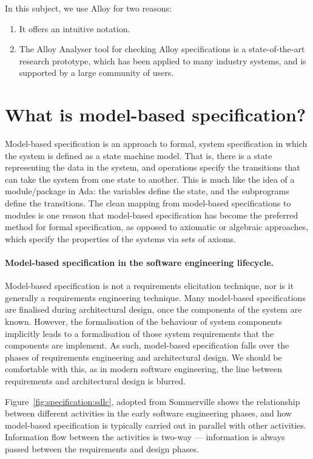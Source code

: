 In this subject, we use Alloy for two reasons:

\begin{enumerate}
 \item It offers an intuitive notation.
 \item The Alloy Analyser tool for checking Alloy specifications is a state-of-the-art research prototype, which has been applied to many industry systems, and is supported by a large community of users.
\end{enumerate}


\section{What is model-based specification?}

Model-based specification is an approach to formal, system specification in which the system is defined as a state machine model. That is, there is a state representing the data in the system, and operations specify the transitions that can take the system from one state to another. This is much like the idea of a module/package in Ada: the variables define the state, and the subprograms define the transitions. The clean mapping from model-based specifications to modules is one reason that model-based specification has become the preferred method for formal specification, as opposed to axiomatic or algebraic approaches, which specify the properties of the systems via sets of axioms.

\paragraph{Model-based specification in the software engineering lifecycle.}
Model-based specification is not a requirements elicitation technique, nor is it generally a requirements engineering technique. Many model-based specifications are finalised during architectural design, once the components of the system are known. However, the formalisation of the behaviour of system components implicitly leads to a formalisation of those system requirements that the components are implement. As such, model-based specification falls over the phases of requirements engineering and architectural design. We should be comfortable with this, as in modern software engineering, the line between requirements and architectural design is blurred.

Figure~\ref{fig:specification:sdlc}, adopted from Sommerville \cite[Ch.\ 27]{sommerville10} shows the relationship between different activities in the early software engineering phases, and how model-based specification is typically carried out in parallel with other activities. Information flow between the activities is two-way --- information is always passed between the requirements and design phases.

